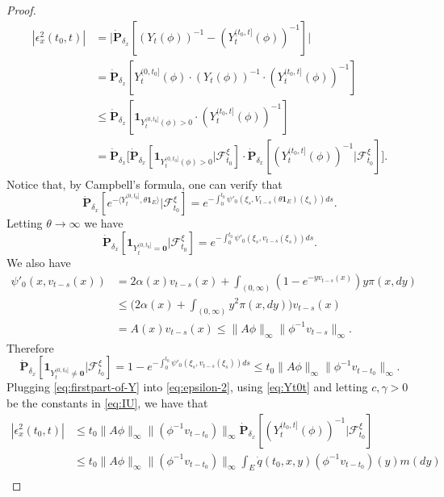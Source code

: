 \documentclass[UTF8]{pkuthss}
\theoremstyle{plain}
\theoremstyle{definition}
\numberwithin{equation}{section}
\begin{document}
\begin{proof}
\begin{equation}
\begin{split}
	|\epsilon_x^2(t_0,t)|
	&= \big| \dot{\mathbf P}_{\delta_x}[(Y_t(\phi))^{-1} - (Y^{(t_0,t]}_t(\phi))^{-1}] \big| \\
	&= \dot{\mathbf P}_{\delta_x}[Y_t^{(0,t_0]}(\phi)\cdot (Y_t(\phi))^{-1}\cdot (Y^{(t_0,t]}_t(\phi))^{-1}]\\
	&\leq \dot{\mathbf P}_{\delta_x}[\mathbf 1_{Y_t^{(0,t_0]}(\phi)>0}\cdot (Y^{(t_0,t]}_t(\phi))^{-1}]\\
	&= \dot{\mathbf P}_{\delta_x} \big[\dot{\mathbf P}_{\delta_x}[\mathbf 1_{Y_t^{(0,t_0]}(\phi)>0}|\mathscr F^\xi_{t_0}] \cdot \dot{\mathbf P}_{\delta_x}[ (Y^{(t_0,t]}_t(\phi))^{-1}|\mathscr F^\xi_{t_0}] \big].
\end{split}\end{equation}
	Notice that, by Campbell's formula, one can verify that
\[
	\dot{\mathbf P}_{\delta_x}[e^{-\langle Y_t^{(0,t_0]},\theta \mathbf 1_E\rangle}|\mathscr F^\xi_{t_0}]
	= e^{-\int_0^{t_0}\psi'_0(\xi_s,V_{t-s}(\theta\mathbf 1_E)(\xi_s))ds}.
\]
	Letting $\theta \to \infty$ we have
\[
	\dot {\mathbf P}_{\delta_x} [ \mathbf 1_{Y_t^{(0,t_0]}=\mathbf 0} | \mathscr F^\xi_{t_0}]
	= e^{-\int_0^{t_0}\psi'_0(\xi_s,v_{t-s}(\xi_s))ds}.
\]
	We also have
\[\begin{split}
	\psi'_0(x,v_{t-s}(x))
	&= 2\alpha(x)v_{t-s}(x) +\int_{(0,\infty)} (1-e^{-yv_{t-s}(x)})y\pi(x,dy)\\
	&\leq \big( 2\alpha (x)+\int_{(0,\infty)}y^2\pi(x,dy) \big) v_{t-s}(x)\\
	&= A(x) v_{t-s}(x) \leq \| A\phi\|_\infty \|\phi^{-1}v_{t-s}\|_\infty.
\end{split}\]
	Therefore
\begin{equation}\label{eq:firstpart-of-Y}
	\dot{\mathbf P}_{\delta_x}[\mathbf 1_{Y_t^{(0,t_0]}\neq \mathbf 0}|\mathscr F^\xi_{t_0}]
	= 1-e^{-\int_0^{t_0}\psi'_0(\xi_s,v_{t-s}(\xi_s))ds}
	\leq t_0\| A\phi\|_\infty \|\phi^{-1}v_{t-t_0}\|_\infty.
\end{equation}
	Plugging \eqref{eq:firstpart-of-Y} into \eqref{eq:epsilon-2}, using \eqref{eq:Yt0t} and letting $c,\gamma > 0$ be the constants in \eqref{eq:IU}, we have that
\begin{equation}\label{eq:epsilon-2-final}\begin{split}
	|\epsilon_x^2(t_0,t)|
	& \leq t_0\| A\phi\|_\infty \|(\phi^{-1}v_{t-t_0})\|_\infty \dot{\mathbf P}_{\delta_x}[ (Y^{(t_0,t]}_t(\phi))^{-1}|\mathscr F^\xi_{t_0}] \\
	& \leq t_0\|  A \phi\|_\infty\|(\phi^{-1}v_{t-t_0}) \|_\infty \int_{E} \dot{q} (t_0,x,y)(\phi^{-1}v_{t-t_0})(y) m(dy)\\

\end{split}
\end{equation}
\end{proof}
\end{document}
